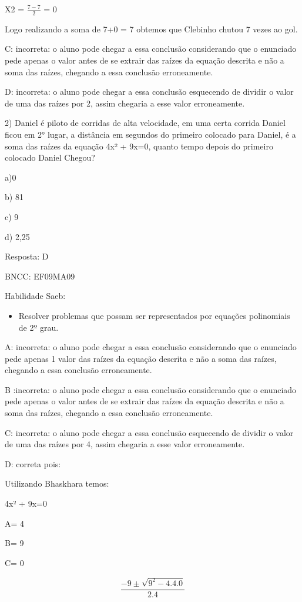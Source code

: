 {X2 = \(\frac{7 - 7}{2}\) = 0

Logo realizando a soma de 7+0 = 7 obtemos que Clebinho chutou 7 vezes ao
gol.

C: incorreta: o aluno pode chegar a essa conclusão considerando que o
enunciado pede apenas o valor antes de se extrair das raízes da equação
descrita e não a soma das raízes, chegando a essa conclusão
erroneamente.

D: incorreta: o aluno pode chegar a essa conclusão esquecendo de dividir
o valor de uma das raízes por 2, assim chegaria a esse valor
erroneamente.

2) Daniel é piloto de corridas de alta velocidade, em uma certa corrida
Daniel ficou em 2° lugar, a distância em segundos do primeiro colocado
para Daniel, é a soma das raízes da equação 4x² + 9x=0, quanto tempo
depois do primeiro colocado Daniel Chegou?

a)0

b) 81

c) 9

d) 2,25

Resposta: D

BNCC: EF09MA09

Habilidade Saeb:

\begin{itemize}
\tightlist
\item
  Resolver problemas que possam ser representados por equações
  polinomiais de 2º grau.
\end{itemize}

A: incorreta: o aluno pode chegar a essa conclusão considerando que o
enunciado pede apenas 1 valor das raízes da equação descrita e não a
soma das raízes, chegando a essa conclusão erroneamente.

B :incorreta: o aluno pode chegar a essa conclusão considerando que o
enunciado pede apenas o valor antes de se extrair das raízes da equação
descrita e não a soma das raízes, chegando a essa conclusão
erroneamente.

C: incorreta: o aluno pode chegar a essa conclusão esquecendo de dividir
o valor de uma das raízes por 4, assim chegaria a esse valor
erroneamente.

D: correta pois:

Utilizando Bhaskhara temos:

4x² + 9x=0

A= 4

B= 9

C= 0

\[\frac{- 9 \pm \sqrt{9^{2} - 4.4.0}}{2.4}\]

}

